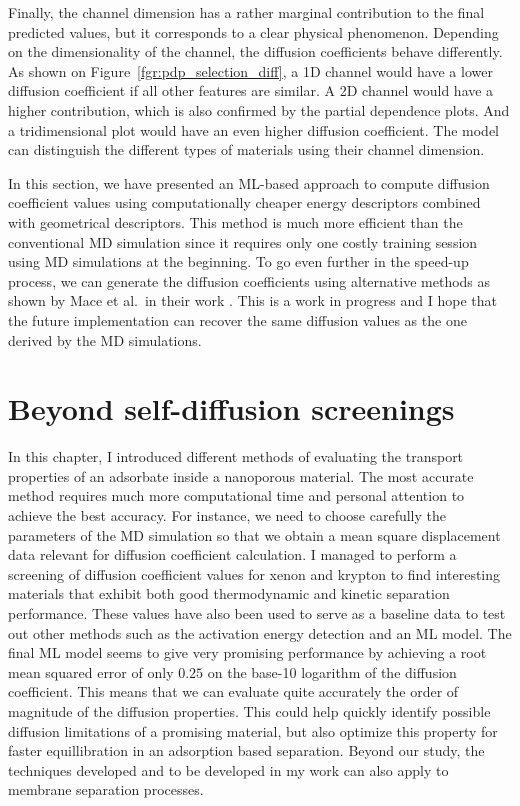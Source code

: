 \documentclass[main]{subfiles}
\begin{document}
Finally, the channel dimension has a rather marginal contribution to the final predicted values, but it corresponds to a clear physical phenomenon. Depending on the dimensionality of the channel, the diffusion coefficients behave differently. As shown on Figure~\ref{fgr:pdp_selection_diff}, a 1D channel would have a lower diffusion coefficient if all other features are similar. A 2D channel would have a higher contribution, which is also confirmed by the partial dependence plots. And a tridimensional plot would have an even higher diffusion coefficient. The model can distinguish the different types of materials using their channel dimension.

In this section, we have presented an ML-based approach to compute diffusion coefficient values using computationally cheaper energy descriptors combined with geometrical descriptors. This method is much more efficient than the conventional MD simulation since it requires only one costly training session using MD simulations at the beginning. To go even further in the speed-up process, we can generate the diffusion coefficients using alternative methods as shown by Mace et al.\ in their work \autocite{Mace_2019}. This is a work in progress and I hope that the future implementation can recover the same diffusion values as the one derived by the MD simulations.

\clearpage
\section{Beyond self-diffusion screenings}

In this chapter, I introduced different methods of evaluating the transport properties of an adsorbate inside a nanoporous material. The most accurate method requires much more computational time and personal attention to achieve the best accuracy. For instance, we need to choose carefully the parameters of the MD simulation so that we obtain a mean square displacement data relevant for diffusion coefficient calculation. I managed to perform a screening of diffusion coefficient values for xenon and krypton to find interesting materials that exhibit both good thermodynamic and kinetic separation performance. These values have also been used to serve as a baseline data to test out other methods such as the activation energy detection and an ML model. The final ML model seems to give very promising performance by achieving a root mean squared error of only $0.25$ on the base-10 logarithm of the diffusion coefficient. This means that we can evaluate quite accurately the order of magnitude of the diffusion properties. This could help quickly identify possible diffusion limitations of a promising material, but also optimize this property for faster equillibration in an adsorption based separation. Beyond our study, the techniques developed and to be developed in my work can also apply to membrane separation processes.
\end{document}
